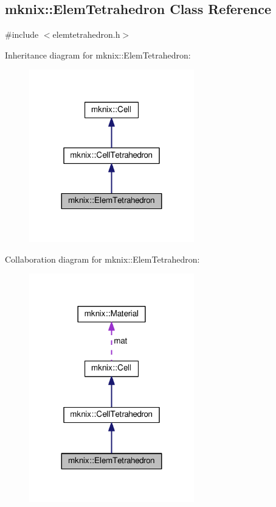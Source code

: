 \hypertarget{classmknix_1_1_elem_tetrahedron}{}\subsection{mknix\+:\+:Elem\+Tetrahedron Class Reference}
\label{classmknix_1_1_elem_tetrahedron}


{\ttfamily \#include $<$elemtetrahedron.\+h$>$}



Inheritance diagram for mknix\+:\+:Elem\+Tetrahedron\+:\nopagebreak
\begin{figure}[H]
\begin{center}
\leavevmode
\includegraphics[width=203pt]{d9/db3/classmknix_1_1_elem_tetrahedron__inherit__graph}
\end{center}
\end{figure}


Collaboration diagram for mknix\+:\+:Elem\+Tetrahedron\+:\nopagebreak
\begin{figure}[H]
\begin{center}
\leavevmode
\includegraphics[width=203pt]{d4/d93/classmknix_1_1_elem_tetrahedron__coll__graph}
\end{center}
\end{figure}
